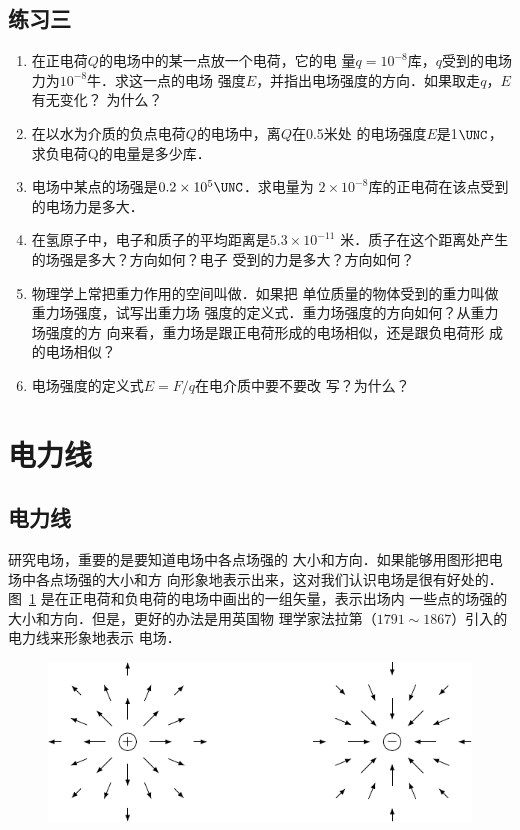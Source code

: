 \subsection*{练习三}

\begin{enumerate}
    \item 在正电荷$Q$的电场中的某一点放一个电荷，它的电
    量$q=10^{-8}$库，$q$受到的电场力为$10^{-8}$牛．求这一点的电场
    强度$E$，并指出电场强度的方向．如果取走$q$，$E$有无变化？
    为什么？
    \item 在以水为介质的负点电荷$Q$的电场中，离$Q$在0.5米处
    的电场强度$E$是1$\UNC$，求负电荷Q的电量是多少库．
    \item 电场中某点的场强是$0.2\times10^5\UNC$．求电量为
    $2\times10^{-8}$库的正电荷在该点受到的电场力是多大．
    \item 在氢原子中，电子和质子的平均距离是$5.3\times10^{-11}$
    米．质子在这个距离处产生的场强是多大？方向如何？电子
    受到的力是多大？方向如何？
    \item 物理学上常把重力作用的空间叫做．如果把
    单位质量的物体受到的重力叫做重力场强度，试写出重力场
    强度的定义式．重力场强度的方向如何？从重力场强度的方
    向来看，重力场是跟正电荷形成的电场相似，还是跟负电荷形
成的电场相似？
\item 电场强度的定义式$E=F/q$在电介质中要不要改
写？为什么？
\end{enumerate}


\section{电力线}
\subsection{电力线}

研究电场，重要的是要知道电场中各点场强的
大小和方向．如果能够用图形把电场中各点场强的大小和方
向形象地表示出来，这对我们认识电场是很有好处的．图~\ref{fig_B_6-6} 
是在正电荷和负电荷的电场中画出的一组矢量，表示出场内
一些点的场强的大小和方向．但是，更好的办法是用英国物
理学家法拉第（$1791 \sim 1867$）引入的电力线来形象地表示
电场．
\begin{figure}[htbp]
    \centering
    \includegraphics{fig/B/6-6.pdf}
    \caption{}\label{fig_B_6-6}
\end{figure}

